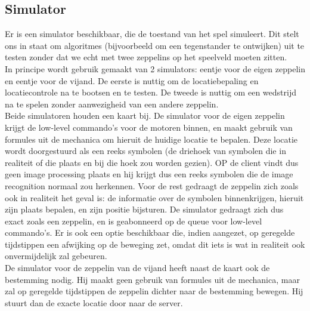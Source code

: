 \documentclass[eind]{penoverslag}
\begin{document}
\subsection{Simulator}
Er is een simulator beschikbaar, die de toestand van het spel simuleert. Dit stelt ons in staat om algoritmes (bijvoorbeeld om een tegenstander te ontwijken) uit te testen zonder dat we echt met twee zeppelins op het speelveld moeten zitten.\\
In principe wordt gebruik gemaakt van 2 simulators: eentje voor de eigen zeppelin en eentje voor de vijand. De eerste is nuttig om de locatiebepaling en locatiecontrole na te bootsen en te testen. De tweede is nuttig om een wedstrijd na te spelen zonder aanwezigheid van een andere zeppelin. \\
Beide simulatoren houden een kaart bij. De simulator voor de eigen zeppelin krijgt de low-level commando's voor de motoren binnen, en maakt gebruik van formules uit de mechanica om hieruit de huidige locatie te bepalen. Deze locatie wordt doorgestuurd als een reeks symbolen (de driehoek van symbolen die in realiteit of die plaats en bij die hoek zou worden gezien). OP de client vindt dus geen image processing plaats en hij krijgt dus een reeks symbolen die de image recognition normaal zou herkennen. Voor de rest gedraagt de zeppelin zich zoals ook in realiteit het geval is: de informatie over de symbolen binnenkrijgen, hieruit zijn plaats bepalen, en zijn positie bijsturen. De simulator gedraagt zich dus exact zoals een zeppelin, en is geabonneerd op de queue voor low-level commando's. Er is ook een optie beschikbaar die, indien aangezet, op geregelde tijdstippen een afwijking op de beweging zet, omdat dit iets is wat in realiteit ook onvermijdelijk zal gebeuren.\\
De simulator voor de zeppelin van de vijand heeft naast de kaart ook de bestemming nodig. Hij maakt geen gebruik van formules uit de mechanica, maar zal op geregelde tijdstippen de zeppelin dichter naar de bestemming bewegen. Hij stuurt dan de exacte locatie door naar de server. \\


\end{document}
